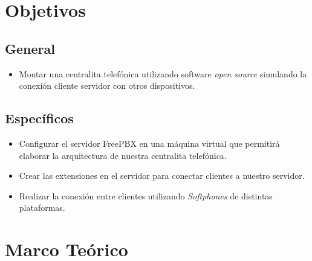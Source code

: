 \documentclass[conference]{IEEEtran}
\begin{document}
\section{Objetivos}
\subsection{General}
\begin{itemize}
\item Montar una centralita telefónica utilizando software \textit{open source} simulando la conexión cliente servidor con otros dispositivos.
\end{itemize}

\subsection{Específicos}
\begin{itemize}
\item Configurar el servidor FreePBX en una máquina virtual que permitirá elaborar la arquitectura de nuestra centralita telefónica.
\item Crear las extensiones en el servidor para conectar clientes a nuestro servidor.
\item Realizar la conexión entre clientes utilizando \textit{Softphones} de distintas plataformas.
\end{itemize}


\section{Marco Teórico}\label{sec:ant}
\end{document}
